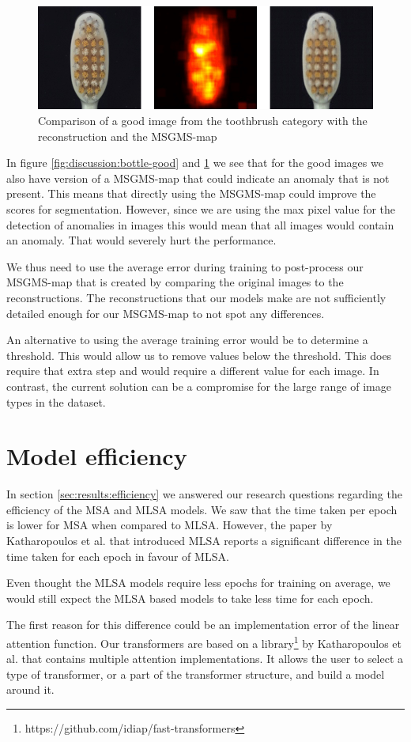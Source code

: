 \begin{figure}[ht!]
\centering
\includegraphics[width=\textwidth]{imgs/samples/toothbrush-good.jpg}
\caption{Comparison of a good image from the toothbrush category with the reconstruction and the MSGMS-map}
\label{fig:discussion:toothbrush-good}
\end{figure}

In figure \ref{fig:discussion:bottle-good} and \ref{fig:discussion:toothbrush-good} we see that for the good images we also have version of a MSGMS-map that could indicate an anomaly that is not present. This means that directly using the MSGMS-map could improve the scores for segmentation. However, since we are using the max pixel value for the detection of anomalies in images this would mean that all images would contain an anomaly. That would severely hurt the performance.

We thus need to use the average error during training to post-process our MSGMS-map that is created by comparing the original images to the reconstructions. The reconstructions that our models make are not sufficiently detailed enough for our MSGMS-map to not spot any differences.

An alternative to using the average training error would be to determine a threshold. This would allow us to remove values below the threshold. This does require that extra step and would require a different value for each image. In contrast, the current solution can be a compromise for the large range of image types in the dataset.

\section{Model efficiency}

In section \ref{sec:results:efficiency} we answered our research questions regarding the efficiency of the MSA and MLSA models. We saw that the time taken per epoch is lower for MSA when compared to MLSA. However, the paper by Katharopoulos et al. \cite{katharopoulos_transformers_2020} that introduced MLSA reports a significant difference in the time taken for each epoch in favour of MLSA.

Even thought the MLSA models require less epochs for training on average, we would still expect the MLSA based models to take less time for each epoch.

The first reason for this difference could be an implementation error of the linear attention function. Our transformers are based on a library\footnote{https://github.com/idiap/fast-transformers} by Katharopoulos et al. that contains multiple attention implementations. It allows the user to select a type of transformer, or a part of the transformer structure, and build a model around it.

